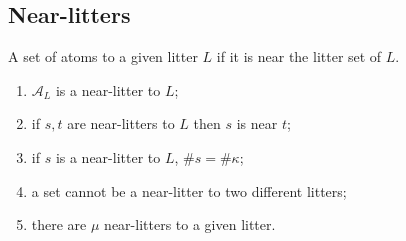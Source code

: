 \subsection{Near-litters}

\begin{definition}
    A set of atoms  to a given litter \( L \) if it is near the litter set of \( L \).
\end{definition}
\begin{lemma}
    \label{lem:isNearLitter}
    \begin{enumerate}
        \item \( \mathcal A_L \) is a near-litter to \( L \);
        \item if \( s, t \) are near-litters to \( L \) then \( s \) is near \( t \);
        \item if \( s \) is a near-litter to \( L \), \( \#s = \#\kappa \);
        \item a set cannot be a near-litter to two different litters;
        \item there are \( \mu \) near-litters to a given litter.
    \end{enumerate}
\end{lemma}
